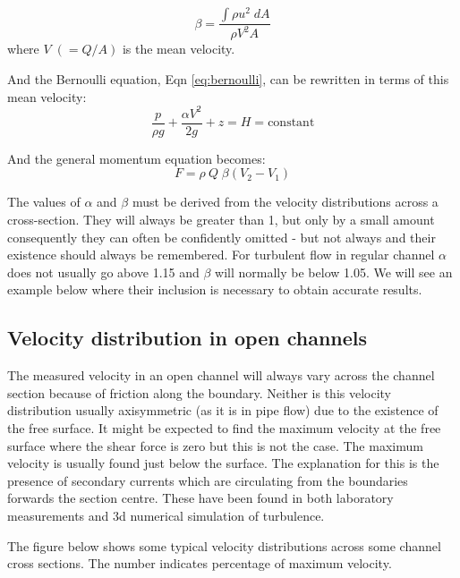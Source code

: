 \documentclass[a4paper, 12pt, british]{article} %
\numberwithin{equation}{section}
\numberwithin{figure}{section}
\numberwithin{table}{section}
\begin{document}
 \begin{equation}
 \beta = \frac{\int \rho u^2 \; dA}{\rho V^2 A}
 \label{eq:beta}
 \end{equation} 
where $V \; (=Q/A)$ is the mean velocity.

And the Bernoulli equation, Eqn \ref{eq:bernoulli}, can be rewritten in terms of this mean velocity:
 \begin{equation}
\frac{p}{\rho g}  + \frac{ \alpha V^2}{2g} + z  = H = \text{constant}
\label{eq:bernoulli_V}
\end{equation}
 

And the general momentum equation becomes:
 \begin{equation}
 F = \rho \:  Q \; \beta(V_{2} - V_{1})
 \label{eq:momentum_gen}
 \end{equation}


The values of $\alpha$ and $\beta$ must be derived from the velocity distributions across a cross-section. They will always be greater than 1, but only by a small amount consequently they can often be confidently omitted - but not always and their existence should always be remembered. For turbulent flow in regular channel $\alpha$ does not usually go above 1.15 and $\beta$ will normally be below 1.05. We will see an example below where their inclusion is necessary to obtain accurate results.

\subsection{Velocity distribution in open channels}

The measured velocity in an open channel will always vary across the channel section because of friction along the boundary. Neither is this velocity distribution usually axisymmetric (as it is in pipe flow) due to the existence of the free surface. It might be expected to find the maximum velocity at the free surface where the shear force is zero but this is not the case. The maximum velocity is usually found just below the surface. The explanation for this is the presence of secondary currents which are circulating from the boundaries forwards the section centre. These have been found in both laboratory measurements and 3d numerical simulation of turbulence.

The figure below shows some typical velocity distributions across some channel cross sections. The number indicates percentage of maximum velocity.
 
\end{document}
